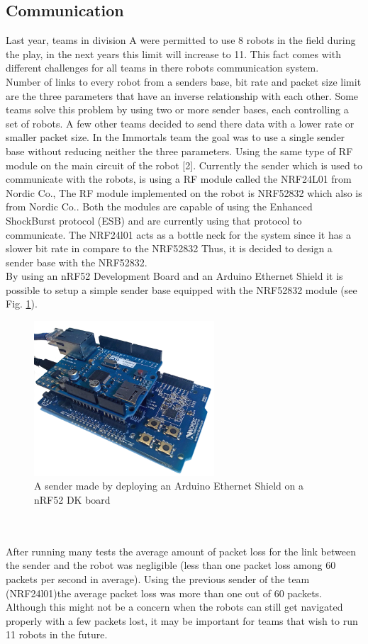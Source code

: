 \subsection{Communication}
Last year, teams in division A were permitted to use 8 robots in the field during the play, in the next years this limit will increase to 11. This fact comes with different challenges for all teams in there robots communication system.\\
Number of links to every robot from a senders base, bit rate and packet size limit are the three parameters that have an inverse relationship with each other. Some teams solve this problem by using two or more sender bases, each controlling a set of robots. A few other teams decided to send there data with a lower rate or smaller packet size. In the Immortals team the goal was to use a single sender base without reducing neither the three parameters. Using the same type of RF module on the main circuit of the robot [2]. Currently the sender which is used to communicate with the robots, is using a RF module called the NRF24L01 from Nordic Co., The RF module implemented on the robot is NRF52832 which also is from Nordic Co.. Both the modules are capable of using the Enhanced ShockBurst protocol (ESB) and are currently using that protocol to communicate. The NRF24l01 acts as a bottle neck for the system since it has a slower bit rate in compare to the NRF52832 Thus, it is decided to design a sender base with the NRF52832.\\
By using an nRF52 Development Board and an Arduino Ethernet Shield it is possible to setup a simple sender base equipped with the NRF52832 module (see Fig. \ref{fig:SIMPLE_SENDER}).\\
\begin{figure}
	\centering
	\includegraphics[width=0.6\textwidth]{images/NRF52832DK_ETH.png}
	\caption{A sender made by deploying an Arduino Ethernet Shield on a nRF52 DK board}
	\label{fig:SIMPLE_SENDER}
\end{figure}\\
\\
After running many tests the average amount of packet loss for the link between the sender and the robot was negligible (less than one packet loss among 60 packets per second in average). Using the previous sender of the team (NRF24l01)the average packet loss was more than one out of 60 packets. Although this might not be a concern when the robots can still get navigated properly with a few packets lost, it may be important for teams that wish to run 11 robots in the future.\\

